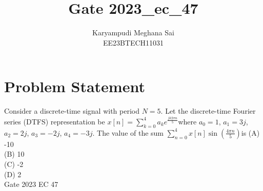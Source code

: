 \documentclass[12pt]{article}
\title{Gate 2023\_ec\_47}
\author{Karyampudi Meghana Sai \\
        EE23BTECH11031}
\begin{document}
\maketitle

\section*{Problem Statement}
Consider a discrete-time signal with period $N=5$. Let the discrete-time Fourier series (DTFS) representation be $ x[n] = \sum\limits_{k=0}^{4} a_k e^{\frac{jk2\pi n}{5}} $where $a_0=1$, $a_1=3j$, $a_2=2j$, $a_3=-2j$, $a_4=-3j$. The value of the sum $\sum\limits_{n=0}^{4}x[n] \sin\left(\frac{4\pi n}{5}\right) $is
(A) -10\\
(B) 10\\
(C) -2\\
(D) 2\\
\hfill Gate 2023 EC 47
\end{document}
